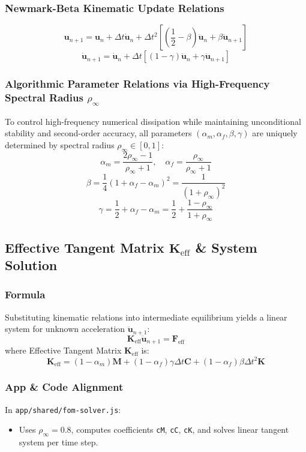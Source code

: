 \subsubsection{Newmark-Beta Kinematic Update Relations}
\begin{equation}
\mathbf{u}_{n+1} = \mathbf{u}_n + \Delta t \dot{\mathbf{u}}_n + \Delta t^2 \left[ \left(\frac{1}{2} - \beta\right) \ddot{\mathbf{u}}_n + \beta \ddot{\mathbf{u}}_{n+1} \right]
\end{equation}
\begin{equation}
\dot{\mathbf{u}}_{n+1} = \dot{\mathbf{u}}_n + \Delta t \left[ (1 - \gamma) \ddot{\mathbf{u}}_n + \gamma \ddot{\mathbf{u}}_{n+1} \right]
\end{equation}

\subsubsection{Algorithmic Parameter Relations via High-Frequency Spectral Radius $\rho_\infty$}
To control high-frequency numerical dissipation while maintaining unconditional stability and second-order accuracy, all parameters $(\alpha_m, \alpha_f, \beta, \gamma)$ are uniquely determined by spectral radius $\rho_\infty \in [0, 1]$:
\begin{equation}
\alpha_m = \frac{2\rho_\infty - 1}{\rho_\infty + 1}, \quad \alpha_f = \frac{\rho_\infty}{\rho_\infty + 1}
\end{equation}
\begin{equation}
\beta = \frac{1}{4} (1 + \alpha_f - \alpha_m)^2 = \frac{1}{(1 + \rho_\infty)^2}
\end{equation}
\begin{equation}
\gamma = \frac{1}{2} + \alpha_f - \alpha_m = \frac{1}{2} + \frac{1 - \rho_\infty}{1 + \rho_\infty}
\end{equation}

\hr

\subsection{Effective Tangent Matrix $\mathbf{K}_{\text{eff}}$ \& System Solution}

\subsubsection{Formula}
Substituting kinematic relations into intermediate equilibrium yields a linear system for unknown acceleration $\ddot{\mathbf{u}}_{n+1}$:
\begin{equation}
\mathbf{K}_{\text{eff}} \ddot{\mathbf{u}}_{n+1} = \mathbf{F}_{\text{eff}}
\end{equation}
where Effective Tangent Matrix $\mathbf{K}_{\text{eff}}$ is:
\begin{equation}
\mathbf{K}_{\text{eff}} = (1 - \alpha_m) \mathbf{M} + (1 - \alpha_f) \gamma \Delta t \mathbf{C} + (1 - \alpha_f) \beta \Delta t^2 \mathbf{K}
\end{equation}

\subsubsection{App \& Code Alignment}
In \texttt{app/shared/fom-solver.js}:
\begin{itemize}
    \item Uses $\rho_\infty = 0.8$, computes coefficients \texttt{cM}, \texttt{cC}, \texttt{cK}, and solves linear tangent system per time step.
\end{itemize}
